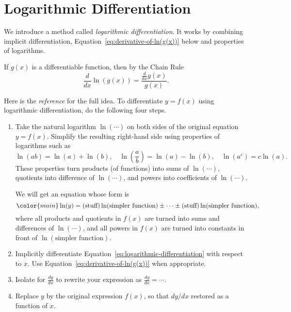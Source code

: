 \documentclass[../main.tex]{subfiles}
\begin{document}
 \section{Logarithmic Differentiation}
  We introduce a method called \emph{logarithmic differentiation}. It works by combining implicit differentiation, Equation~\eqref{eq:derivative-of-ln(g(x))} below and properties of logarithms.
  \begin{mdframed}[style=withref]
    If \(g(x)\) is a differentiable function, then by the Chain Rule
    \begin{equation} \label{eq:derivative-of-ln(g(x))}
      \frac{d}{dx} \ln( g(x) ) = \frac{\frac{d}{dx}g(x)}{g(x)}.
    \end{equation}

  \end{mdframed}

  Here is the \emph{reference} for the full idea. To differentiate \(y = f(x)\) using logarithmic differentiation, do the following four steps.
  \begin{enumerate}
    \item Take the natural logarithm \(\ln(\cdots{})\) on both sides of the original equation \(y = f(x)\). Simplify the resulting right-hand side using properties of logarithms such as 
      \[
        \ln(ab) = \ln(a) + \ln(b), \quad \ln\left(\frac{a}{b}\right) = \ln(a) - \ln(b), \quad \ln(a^{c}) = c \ln(a). 
      \]
      These properties turn products (of functions) into sums of \(\ln(\cdots)\), quotients into difference of \(\ln(\cdots)\), and powers into coefficients of \(\ln(\cdots)\).

      We will get an equation whose form is 
      \begin{equation} \label{eq:logarithmic-differentiation}
        \color{main}
        \ln(y) = (\text{stuff})\ln( \text{simpler function} ) \pm \cdots \pm (\text{stuff})\ln( \text{simpler function} ),
      \end{equation}
      where all products and quotients in \(f(x)\) are turned into sums and differences of \(\ln(\cdots)\), and all powers in \(f(x)\) are turned into constants in front of \(\ln(\text{simpler function})\).


    \item Implicitly differentiate Equation~\eqref{eq:logarithmic-differentiation} with respect to \(x\). Use Equation~\eqref{eq:derivative-of-ln(g(x))} when appropriate.

    \item Isolate for \(\frac{dy}{dx}\) to rewrite your expression as \(\frac{dy}{dx} = \cdots\). 
    \item Replace \(y\) by the original expression \(f(x)\), so that \(dy/dx\) restored as a function of \(x\).
  \end{enumerate}
  \clearpage
\end{document}
